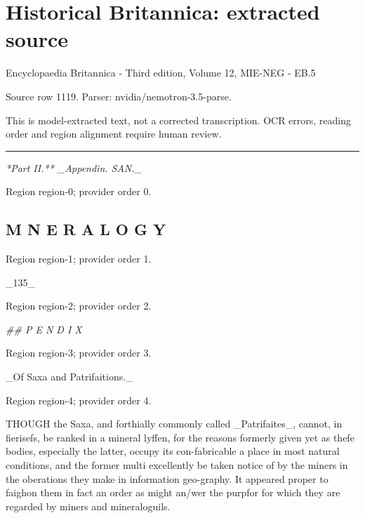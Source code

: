 \documentclass[11pt]{article}
\begin{document}
\section*{Historical Britannica: extracted source}
Encyclopaedia Britannica - Third edition, Volume 12, MIE-NEG - EB.5\par
{\small Source row 1119. Parser: nvidia/nemotron-3.5-parse.\par}
{\small This is model-extracted text, not a corrected transcription. OCR errors, reading order and region alignment require human review.\par}
\hrule\medskip
{\small\itshape **Part II.** \_Appendin. SAN.\_\par}

{\scriptsize\color{gray} Region region-0; provider order 0.\par}
\medskip

\subsection*{M N E R A L O G Y}

{\scriptsize\color{gray} Region region-1; provider order 1.\par}
\medskip

\_135\_
\par

{\scriptsize\color{gray} Region region-2; provider order 2.\par}
\medskip

{\small\itshape \#\# P E N D I X\par}

{\scriptsize\color{gray} Region region-3; provider order 3.\par}
\medskip

\_Of Saxa and Patrifaitions.\_
\par

{\scriptsize\color{gray} Region region-4; provider order 4.\par}
\medskip

THOUGH the Saxa, and forthially commonly called \_Patrifaites\_, cannot, in fierisefs, be ranked in a mineral lyffen, for the reasons formerly given yet as thefe bodies, especially the latter, occupy its con-fabricable a place in most natural conditions, and the former multi excellently be taken notice of by the miners in the oberations they make in information geo-graphy. It appeared proper to faighon them in fact an order as might an/wer the purpfor for which they are regarded by miners and mineraloguils.
\par
\end{document}
